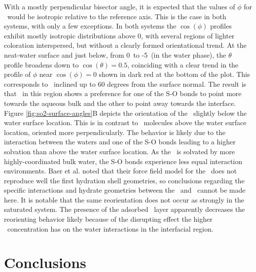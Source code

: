 \documentclass{article}
\begin{document}
 With a mostly perpendicular bisector angle, it is expected that the values of $\phi$ for \suldiox~would be isotropic relative to the reference axis. This is the case in both systems, with only a few exceptions. In both systems the $\cos(\phi)$ profiles exhibit mostly isotropic distributions above 0\angs, with several regions of lighter coloration interspersed, but without a clearly formed orientational trend. At the neat-water surface and just below, from 0\angs~to -5\angs~(in the water phase), the $\theta$ profile broadens down to $\cos(\theta)=0.5$, coinciding with a clear trend in the profile of $\phi$ near $\cos(\phi)=0$ shown in dark red at the bottom of the plot. This corresponds to \suldiox~inclined up to 60 degrees from the surface normal. The result is that \suldiox~in this region shows a preference for one of the S-O bonds to point more towards the aqueous bulk and the other to point away towards the interface. Figure \ref{fig:so2-surface-angles}B depicts the orientation of the \suldiox~slightly below the water surface location. This is in contrast to \suldiox~molecules above the water surface location, oriented more perpendicularly. The behavior is likely due to the interaction between the waters and one of the S-O bonds leading to a higher solvation than above the water surface location. As the \suldiox~is solvated by more highly-coordinated bulk water, the S-O bonds experience less equal interaction environments. Baer et al. noted that their force field model for the \suldiox~does not reproduce well the first hydration shell geometries,\cite{Baer2010} so conclusions regarding the specific interactions and hydrate geometries between the \suldiox~and \wat~cannot be made here. It is notable that the same reorientation does not occur as strongly in the saturated system. The presence of the adsorbed \suldiox~layer apparently decreases the reorienting behavior likely because of the disrupting effect the higher \suldiox~concentration has on the water interactions in the interfacial region. 

\section {Conclusions}
\end{document}

